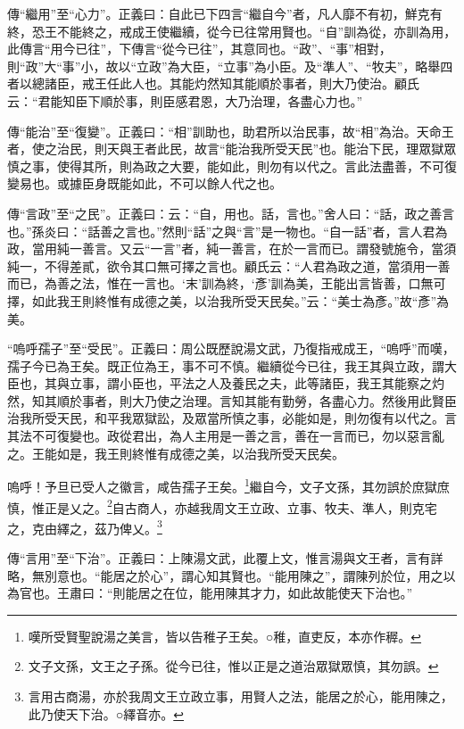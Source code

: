 {\noindent\zhuan{}\fzbyks 傳“繼用”至“心力”。正義曰：自此已下四言“繼自今”者，凡人靡不有初，鮮克有終，恐王不能終之，戒成王使繼續，從今已往常用賢也。“自”訓為從，亦訓為用，此傳言“用今已往”，下傳言“從今已往”，其意同也。“政”、“事”相對，則“政”大“事”小，故以“立政”為大臣，“立事”為小臣。及“準人”、“牧夫”，略舉四者以總諸臣，戒王任此人也。其能灼然知其能順於事者，則大乃使治。顧氏云：“君能知臣下順於事，則臣感君恩，大乃治理，各盡心力也。” \par}

{\noindent\zhuan{}\fzbyks 傳“能治”至“復變”。正義曰：“相”訓助也，助君所以治民事，故“相”為治。天命王者，使之治民，則天與王者此民，故言“能治我所受天民”也。能治下民，理眾獄眾慎之事，使得其所，則為政之大要，能如此，則勿有以代之。言此法盡善，不可復變易也。或據臣身既能如此，不可以餘人代之也。 \par}

{\noindent\zhuan{}\fzbyks 傳“言政”至“之民”。正義曰：云：“自，用也。話，言也。”舍人曰：“話，政之善言也。”孫炎曰：“話善之言也。”然則“話”之與“言”是一物也。“自一話”者，言人君為政，當用純一善言。又云“一言”者，純一善言，在於一言而已。謂發號施令，當須純一，不得差貳，欲令其口無可擇之言也。顧氏云：“人君為政之道，當須用一善而已，為善之法，惟在一言也。‘末’訓為終，‘彥’訓為美，王能出言皆善，口無可擇，如此我王則終惟有成德之美，以治我所受天民矣。”云：“美士為彥。”故“彥”為美。 \par}

{\noindent\shu{}\fzkt “嗚呼孺子”至“受民”。正義曰：周公既歷說湯文武，乃復指戒成王，“嗚呼”而嘆，孺子今已為王矣。既正位為王，事不可不慎。繼續從今已往，我王其與立政，謂大臣也，其與立事，謂小臣也，平法之人及養民之夫，此等諸臣，我王其能察之灼然，知其順於事者，則大乃使之治理。言知其能有勤勞，各盡心力。然後用此賢臣治我所受天民，和平我眾獄訟，及眾當所慎之事，必能如是，則勿復有以代之。言其法不可復變也。政從君出，為人主用是一善之言，善在一言而已，勿以惡言亂之。王能如是，我王則終惟有成德之美，以治我所受天民矣。 \par}

嗚呼！予旦已受人之徽言，咸告孺子王矣。\footnote{嘆所受賢聖說湯之美言，皆以告稚子王矣。○稚，直吏反，本亦作稺。}繼自今，文子文孫，其勿誤於庶獄庶慎，惟正是乂之。\footnote{文子文孫，文王之子孫。從今已往，惟以正是之道治眾獄眾慎，其勿誤。}自古商人，亦越我周文王立政、立事、牧夫、準人，則克宅之，克由繹之，茲乃俾乂。\footnote{言用古商湯，亦於我周文王立政立事，用賢人之法，能居之於心，能用陳之，此乃使天下治。○繹音亦。}


{\noindent\zhuan{}\fzbyks 傳“言用”至“下治”。正義曰：上陳湯文武，此覆上文，惟言湯與文王者，言有詳略，無別意也。“能居之於心”，謂心知其賢也。“能用陳之”，謂陳列於位，用之以為官也。王肅曰：“則能居之在位，能用陳其才力，如此故能使天下治也。” \par}

